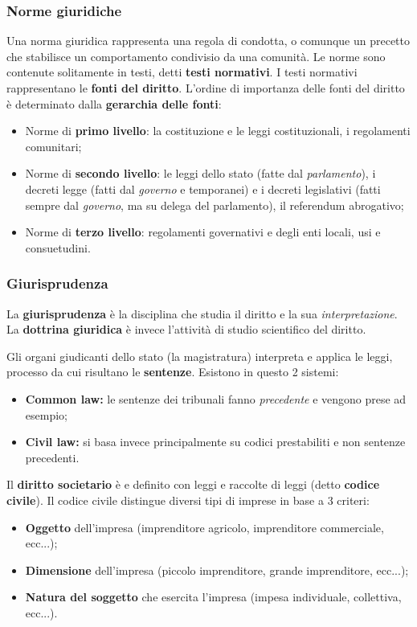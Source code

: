\documentclass[a4paper,11pt]{article}
\begin{document}
\subsubsection{Norme giuridiche}
Una norma giuridica rappresenta una regola di condotta, o comunque un precetto che stabilisce un comportamento condivisio da una comunità.
Le norme sono contenute solitamente in testi, detti \textbf{testi normativi}.
I testi normativi rappresentano le \textbf{fonti del diritto}.
L'ordine di importanza delle fonti del diritto è determinato dalla \textbf{gerarchia delle fonti}:
\begin{itemize}
	\item Norme di \textbf{primo livello}: la costituzione e le leggi costituzionali, i regolamenti comunitari;
	\item Norme di \textbf{secondo livello}: le leggi dello stato (fatte dal \textit{parlamento}), i decreti legge (fatti dal \textit{governo} e temporanei) e i decreti legislativi (fatti sempre dal \textit{governo}, ma su delega del parlamento), il referendum abrogativo;
	\item Norme di \textbf{terzo livello}: regolamenti governativi e degli enti locali, usi e consuetudini.
\end{itemize}

\subsubsection{Giurisprudenza}
La \textbf{giurisprudenza} è la disciplina che studia il diritto e la sua \textit{interpretazione}.
La \textbf{dottrina giuridica} è invece l'attività di studio scientifico del diritto.

Gli organi giudicanti dello stato (la magistratura) interpreta e applica le leggi, processo da cui risultano le \textbf{sentenze}.
Esistono in questo 2 sistemi:
\begin{itemize}
	\item \textbf{Common law:} le sentenze dei tribunali fanno \textit{precedente} e vengono prese ad esempio;
	\item \textbf{Civil law:} si basa invece principalmente su codici prestabiliti e non sentenze precedenti.
\end{itemize}

Il \textbf{diritto societario} è e definito con leggi e raccolte di leggi (detto \textbf{codice civile}).
Il codice civile distingue diversi tipi di imprese in base a 3 criteri:
\begin{itemize}
	\item \textbf{Oggetto} dell'impresa (imprenditore agricolo, imprenditore commerciale, ecc...);
	\item \textbf{Dimensione} dell'impresa (piccolo imprenditore, grande imprenditore, ecc...);
	\item \textbf{Natura del soggetto} che esercita l'impresa (impesa individuale, collettiva, ecc...).
\end{itemize}
\end{document}
